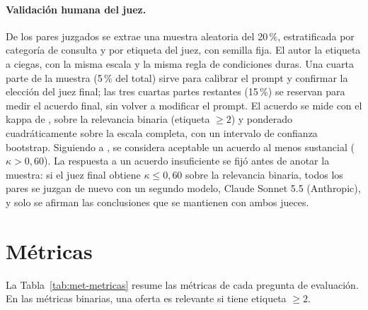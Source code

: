 \paragraph{Validación humana del juez.} De los pares juzgados se extrae una muestra aleatoria del 20\,\%, estratificada por categoría de consulta y por etiqueta del juez, con semilla fija. El autor la etiqueta a ciegas, con la misma escala y la misma regla de condiciones duras. Una cuarta parte de la muestra (5\,\% del total) sirve para calibrar el prompt y confirmar la elección del juez final; las tres cuartas partes restantes (15\,\%) se reservan para medir el acuerdo final, sin volver a modificar el prompt. El acuerdo se mide con el kappa de \citet{Cohen1960}, sobre la relevancia binaria (etiqueta $\geq 2$) y ponderado cuadráticamente sobre la escala completa, con un intervalo de confianza bootstrap. Siguiendo a \citet{Landis1977}, se considera aceptable un acuerdo al menos sustancial ($\kappa > 0{,}60$). La respuesta a un acuerdo insuficiente se fijó antes de anotar la muestra: si el juez final obtiene $\kappa \leq 0{,}60$ sobre la relevancia binaria, todos los pares se juzgan de nuevo con un segundo modelo, Claude Sonnet 5.5 (Anthropic), y solo se afirman las conclusiones que se mantienen con ambos jueces.

\section{Métricas}
\label{sec:met-metricas}

La Tabla~\ref{tab:met-metricas} resume las métricas de cada pregunta de evaluación. En las métricas binarias, una oferta es relevante si tiene etiqueta $\geq 2$.

